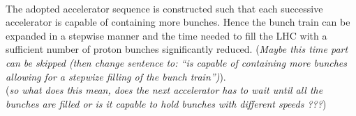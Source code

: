 \\
The adopted accelerator sequence is constructed such that each successive accelerator is capable of containing more bunches. Hence the bunch train can be expanded in a stepwise manner and the time needed to fill the LHC with a sufficient number of proton bunches significantly reduced. (\textit{Maybe this time part can be skipped (then change sentence to: ``is capable of containing more bunches allowing for a stepwize filling of the bunch train'')}).\\
(\textit{so what does this mean, does the next accelerator has to wait until all the bunches are filled or is it capable to hold bunches with different speeds ???})

